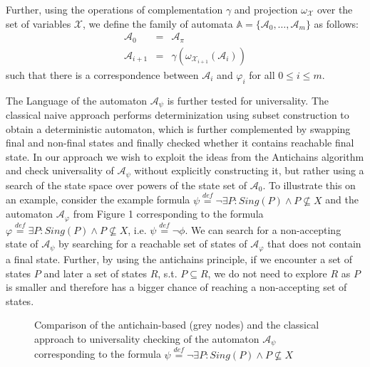 \documentclass{eeict}
\begin{document}
Further, using the operations of complementation $\gamma$ and projection
$\omega_{\mathcal{X}}$ over the set of variables $\mathcal{X}$, we define the
family of automata $\mathds{A} = \{\mathcal{A}_0,\ldots,\mathcal{A}_m\}$ as follows:
\begin{eqnarray}
 \mathcal{A}_0 & = & \mathcal{A}_\pi\\
 \mathcal{A}_{i+1} & = & \gamma(\omega_{\mathcal{X}_{i+1}} (\mathcal{A}_i))
\end{eqnarray}
such that there is a correspondence between $\mathcal{A}_i$ and $\varphi_i$ for
all $0 \leq i \leq m$.

The Language of the automaton $\mathcal{A}_\psi$ is further tested for
universality.
The classical naive approach performs determinization using subset construction
to obtain a deterministic automaton, which is further complemented by
swapping final and non-final states and finally checked whether it contains
reachable final state. In our approach we wish to exploit the ideas from the
Antichains algorithm \cite{anti} and check universality of $\mathcal{A}_\psi$
without explicitly constructing it, but rather using a search of the state space
over powers of the state set of $\mathcal{A}_0$. To illustrate this on an
example, consider the example formula $\psi \overset{\mathit{def}}{=}
\neg\exists P:
 Sing(P) \wedge P \not\subseteq X$ and the automaton
$\mathcal{A}_\varphi$ from Figure 1 corresponding to the formula $\varphi
\overset{\mathit{def}}{=} \exists P:
 Sing(P) \wedge P \not\subseteq X$, i.e. $\psi \overset{\mathit{def}}{=} \neg
 \phi$. We can search for a non-accepting state of $\mathcal{A}_\psi$ by
 searching for a reachable set of states of $\mathcal{A}_\varphi$ that does not
 contain a final state. Further, by using the antichains principle, if we
 encounter a set of states $P$ and later a set of states $R$, s.t. $P \subseteq
 R$, we do not need to explore $R$ as $P$ is smaller and therefore has a bigger
 chance of reaching a non-accepting set of states.

\begin{figure}
 \begin{center}
 \end{center}
 \caption{Comparison of the antichain-based (grey nodes) and the classical
 approach to universality checking of the automaton $\mathcal{A}_\psi$
 corresponding to the formula $\psi \overset{\mathit{def}}{=} \neg\exists P:
 Sing(P) \wedge P \not\subseteq X$}\label{compare}
\end{figure}
\end{document}
